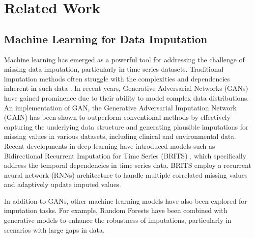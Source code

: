 \section{Related Work}
\subsection{Machine Learning for Data Imputation }
 

Machine learning has emerged as a powerful tool for addressing the challenge of missing data imputation, particularly in time series datasets. Traditional imputation methods often struggle with the complexities and dependencies inherent in such data \cite{chen2024deep}.  In recent years, Generative Adversarial Networks (GANs) \cite{GAN} have gained prominence due to their ability to model complex data distributions. An implementation of GAN, the Generative Adversarial Imputation Network (GAIN) has been shown to outperform conventional methods by effectively capturing the underlying data structure and generating plausible imputations for missing values in various datasets, including clinical and environmental data\cite{Dong_GAIN,Yang_GAIN}. Recent developments in deep learning have introduced models such as Bidirectional Recurrent Imputation for Time Series (BRITS) \cite{BRITS}, which specifically address the temporal dependencies in time series data. BRITS employ a recurrent neural network (RNNs) \cite{yu2019review} architecture to handle multiple correlated missing values and adaptively update imputed values.

In addition to GANs, other machine learning models have also been explored for imputation tasks. For example, Random Forests have been combined with generative models \cite{GAN_RF} to enhance the robustness of imputations, particularly in scenarios with large gaps in data. 




